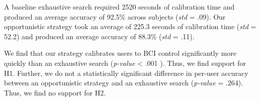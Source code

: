 A baseline exhaustive search required 2520 seconds of calibration time and produced an average accuracy of 92.5\% across subjects (\textit{std} = .09). Our opportunistic strategy took an average of 225.3 seconds of calibration time (\textit{std} = 52.2) and produced an average accuracy of 88.3\% (\textit{std} = .11).

We find that our strategy calibrates users to BCI control significantly more quickly than an exhaustive search (\textit{p-value} < .001 ). Thus, we find support for H1. Further, we do not a statistically significant difference in per-user accuracy between an opportunistic strategy and an exhaustive search (\textit{p-value} = .264). Thus, we find no support for H2.

